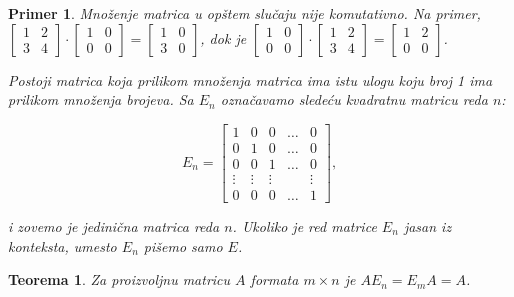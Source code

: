 \documentclass[11pt]{article}
\theoremstyle{masulthm}
\newtheorem{theorem}{Teorema}[section]
\theoremstyle{masuldef}
\theoremstyle{masulexmp}
\newtheorem*{exmp*}{Primer}
\begin{document}
\begin{exmp*}
    Množenje matrica u opštem slučaju nije komutativno. Na primer,
    $
    \begin{bmatrix}
        1 & 2 \\
        3 & 4
    \end{bmatrix}
    \cdot
    \begin{bmatrix}
        1 & 0 \\
        0 & 0
    \end{bmatrix}
    =
    \begin{bmatrix}
        1 & 0 \\
        3 & 0
    \end{bmatrix}
    $, dok je
    $
    \begin{bmatrix}
        1 & 0 \\
        0 & 0
    \end{bmatrix}
    \cdot
    \begin{bmatrix}
        1 & 2 \\
        3 & 4
    \end{bmatrix}
    =
    \begin{bmatrix}
        1 & 2 \\
        0 & 0
    \end{bmatrix}
    $.
    
    Postoji matrica koja prilikom množenja matrica ima istu ulogu koju broj 1 ima prilikom množenja brojeva.
    Sa $ E_n $ označavamo sledeću kvadratnu matricu reda $ n $:
    
    \begin{equation*}
        E_n =
        \begin{bmatrix}
            1 & 0 & 0 & \dots & 0 \\
            0 & 1 & 0 & \dots & 0 \\
            0 & 0 & 1 & \dots & 0 \\
            \vdots & \vdots & \vdots & & \vdots \\
            0 & 0 & 0 & \dots & 1
        \end{bmatrix},
    \end{equation*}
    
    i zovemo je \emph{jedinična matrica reda} $ n $.
    Ukoliko je red matrice $ E_n $ jasan iz konteksta, umesto $ E_n $ pišemo samo $ E $.
\end{exmp*}

\begin{theorem}
  Za proizvoljnu matricu $ A $ formata $ m \times n $ je $ AE_n = E_mA = A $.
\end{theorem}
\end{document}
